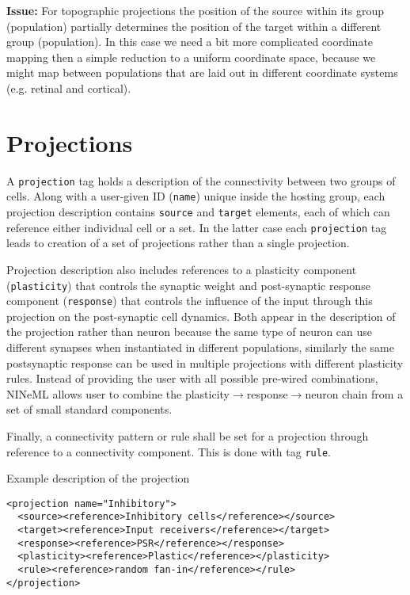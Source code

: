 \documentclass{article}
\newcommand{\issue}[1]{%
\begin{center}
\colorbox{issuecolor}{\parbox{0.8\linewidth}{\textbf{Issue:} #1}}
\end{center}%
}
\begin{document}
\issue{For topographic projections the position of the source within its group
(population) partially determines the position of the target within a different
group (population). In this case we need a bit more complicated coordinate
mapping then a simple reduction to a uniform coordinate space, because we
might map between populations that are laid out in different coordinate
systems (e.g. retinal and cortical).}

\section{Projections}
\label{projections}

A {\tt projection} tag holds a description of the connectivity between two groups
of cells. Along with a user-given ID ({\tt name}) unique inside the hosting group,
each projection description contains {\tt source} and {\tt target} elements, each
of which can reference either individual cell or a set. In the latter case each
{\tt projection} tag leads to creation of a set of projections rather than a
single projection.

Projection description also includes references to a plasticity component ({\tt plasticity})
that controls the synaptic weight and post-synaptic response component ({\tt response})
that controls the influence of the input through this projection on the post-synaptic
cell dynamics. Both appear in the description of the projection rather than
neuron because the same type of neuron can use different synapses when instantiated in
different populations, similarly the same postsynaptic response can be used in multiple
projections with different plasticity rules. Instead of providing the user with all
possible pre-wired combinations, NINeML allows user to combine the
plasticity$\rightarrow$response$\rightarrow$neuron chain from a set of small
standard components.

Finally, a connectivity pattern or rule shall be set for a projection through
reference to a connectivity component. This is done with tag {\tt rule}.

Example description of the projection
\begin{verbatim}
<projection name="Inhibitory">
  <source><reference>Inhibitory cells</reference></source>
  <target><reference>Input receivers</reference></target>
  <response><reference>PSR</reference></response>
  <plasticity><reference>Plastic</reference></plasticity>
  <rule><reference>random fan-in</reference></rule>
</projection>
\end{verbatim}
\end{document}
